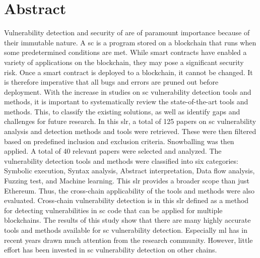 \chapter*{Abstract}
Vulnerability detection and security of  are of paramount importance because of their immutable nature. A \acrlong{sc} is a program stored on a blockchain that runs when some predetermined conditions are met. While smart contracts have enabled a variety of applications on the blockchain, they may pose a significant security risk. Once a smart contract is deployed to a blockchain, it cannot be changed. It is therefore imperative that all bugs and errors are pruned out before deployment. With the increase in studies on \acrlong{sc} vulnerability detection tools and methods, it is important to systematically review the state-of-the-art tools and methods. This, to classify the existing solutions, as well as identify gaps and challenges for future research. In this \acrfull{slr}, a total of 125 papers on \acrlong{sc} vulnerability analysis and detection methods and tools were retrieved. These were then filtered based on predefined inclusion and exclusion criteria. Snowballing was then applied. A total of 40 relevant papers were selected and analyzed. The vulnerability detection tools and methods were classified into six categories: Symbolic execution, Syntax analysis, Abstract interpretation, Data flow analysis, Fuzzing test, and Machine learning. This \acrshort{slr} provides a broader scope than just Ethereum. Thus, the cross-chain applicability of the tools and methods were also evaluated. Cross-chain vulnerability detection is in this \acrshort{slr} defined as a method for detecting vulnerabilities in \acrlong{sc} code that can be applied for multiple blockchains. The results of this study show that there are many highly accurate tools and methods available for \acrfull{sc} vulnerability detection. Especially \acrlong{ml} has in recent years drawn much attention from the research community. However, little effort has been invested in \acrlong{sc} vulnerability detection on other chains.
